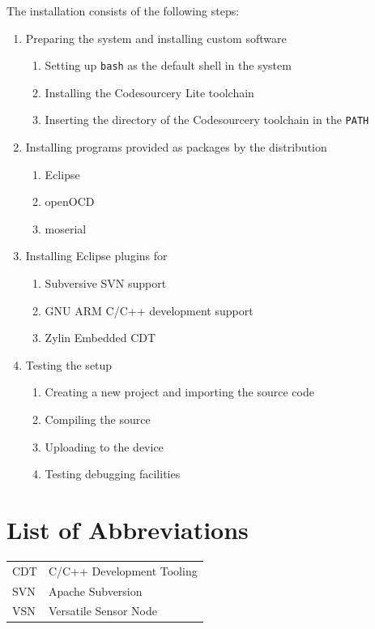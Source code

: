 \documentclass[a4paper, 10pt]{article}
\begin{document}
The installation consists of the following steps:
	\begin{enumerate}
	\item Preparing the system and installing custom software
		\begin{enumerate}
		\item Setting up \verb+bash+ as the default shell in the system
		\item Installing the Codesourcery Lite toolchain
		\item Inserting the directory of the Codesourcery toolchain in the \verb+PATH+
		\end{enumerate}
	\item Installing programs provided as packages by the distribution
		\begin{enumerate}
		\item Eclipse
		\item openOCD
		\item moserial
		\end{enumerate}
	\item Installing Eclipse plugins for
		\begin{enumerate}
		\item Subversive SVN support
		\item GNU ARM C/C++ development support
		\item Zylin Embedded CDT
		\end{enumerate}
	\item Testing the setup
		\begin{enumerate}
		\item Creating a new project and importing the source code
		\item Compiling the source
		\item Uploading to the device
		\item Testing debugging facilities
		\end{enumerate}
	\end{enumerate}

\newpage

\tableofcontents
\newpage

\listoffigures
\newpage

\section*{List of Abbreviations}
	\begin{tabular}{ l l }
    CDT	    & C/C++ Development Tooling \\
    SVN     & Apache Subversion \\
    VSN     & Versatile Sensor Node \\
	\end{tabular}
\newpage
\end{document}
